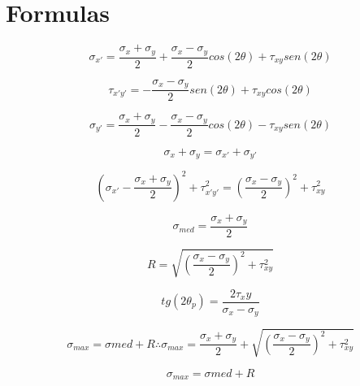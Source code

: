 \documentclass[a4paper]{article}
\begin{document}
\section{Formulas}

\begin{equation}
	\label{sigma_x'}
	\sigma_{x'} = \frac{\sigma_x + \sigma_y}{2} + \frac{\sigma_x - \sigma_y}{2}cos(2 \theta) + \tau_{xy}sen(2\theta)
\end{equation}

\begin{equation}
	\label{tau_xy'}	
	\tau_{x'y'} = -\frac{\sigma_x - \sigma_y}{2}sen(2 \theta) + \tau_{xy}cos(2\theta)
\end{equation}

\begin{equation}
	\label{sigma_y'}
	\sigma_{y'} = \frac{\sigma_x + \sigma_y}{2} - \frac{\sigma_x - \sigma_y}{2}cos(2 \theta) - \tau_{xy}sen(2\theta)
\end{equation}

\begin{equation}
	\sigma_x + \sigma_y = \sigma_{x'} + \sigma_{y'}
\end{equation}

\begin{equation}
	(\sigma_{x'} - \frac{\sigma_x + \sigma_y}{2})^2 + \tau_{x'y'}^2 = (\frac{\sigma_x - \sigma_y}{2})^2 + \tau_{xy}^2
\end{equation}

\begin{equation}
	\sigma_{med} = \frac{\sigma_x + \sigma_y}{2} 
\end{equation}

\begin{equation}
	R =  \sqrt{(\frac{\sigma_x - \sigma_y}{2})^2 + \tau_{xy}^2}  
\end{equation}

\begin{equation}
	tg(2\theta_p) = \frac{2\tau_xy}{\sigma_x - \sigma_y}
\end{equation}

\begin{equation}
	\sigma_{max} = \sigma{med} + R \therefore \sigma_{max} = \frac{\sigma_x + \sigma_y}{2} + \sqrt{(\frac{\sigma_x - \sigma_y}{2})^2 + \tau_{xy}^2}
\end{equation}

\begin{equation}
	\sigma_{max} = \sigma{med} + R
\end{equation}
\end{document}
